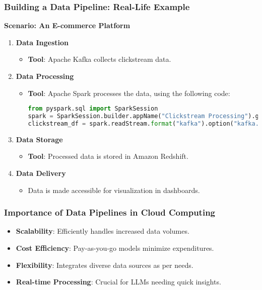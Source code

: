 \documentclass[aspectratio=169]{beamer}
\begin{document}
\begin{frame}[fragile]
    \frametitle{Building a Data Pipeline: Real-Life Example}
    \textbf{Scenario: An E-commerce Platform}
    
    \begin{enumerate}
        \item \textbf{Data Ingestion}
            \begin{itemize}
                \item \textbf{Tool}: Apache Kafka collects clickstream data.
            \end{itemize}
        
        \item \textbf{Data Processing}
            \begin{itemize}
                \item \textbf{Tool}: Apache Spark processes the data, using the following code:
                \begin{lstlisting}[language=python]
from pyspark.sql import SparkSession
spark = SparkSession.builder.appName("Clickstream Processing").getOrCreate()
clickstream_df = spark.readStream.format("kafka").option("kafka.bootstrap.servers", "localhost:9092").load()
                \end{lstlisting}
            \end{itemize}
        
        \item \textbf{Data Storage}
            \begin{itemize}
                \item \textbf{Tool}: Processed data is stored in Amazon Redshift.
            \end{itemize}
        
        \item \textbf{Data Delivery}
            \begin{itemize}
                \item Data is made accessible for visualization in dashboards.
            \end{itemize}
    \end{enumerate}
\end{frame}

\begin{frame}[fragile]
    \frametitle{Importance of Data Pipelines in Cloud Computing}
    \begin{itemize}
        \item \textbf{Scalability}: Efficiently handles increased data volumes.
        \item \textbf{Cost Efficiency}: Pay-as-you-go models minimize expenditures.
        \item \textbf{Flexibility}: Integrates diverse data sources as per needs.
        \item \textbf{Real-time Processing}: Crucial for LLMs needing quick insights.
    \end{itemize}
\end{frame}
\end{document}
